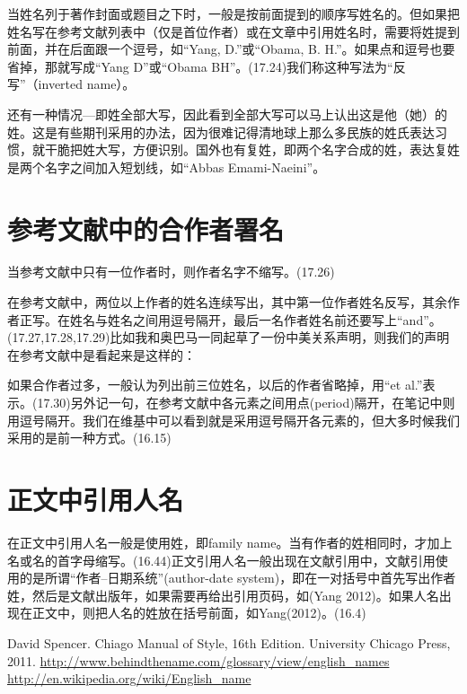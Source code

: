 \documentclass[UTF8,a4paper]{article}
\begin{document}
当姓名列于著作封面或题目之下时，一般是按前面提到的顺序写姓名的。但如果把姓名写在参考文献列表中（仅是首位作者）或在文章中引用姓名时，需要将姓提到前面，并在后面跟一个逗号，如“Yang, D.”或“Obama, B. H.”。如果点和逗号也要省掉，那就写成“Yang D”或“Obama BH”。(17.24)我们称这种写法为“反写”（inverted name）。

还有一种情况---即姓全部大写，因此看到全部大写可以马上认出这是他（她）的姓。这是有些期刊采用的办法，因为很难记得清地球上那么多民族的姓氏表达习惯，就干脆把姓大写，方便识别。国外也有复姓，即两个名字合成的姓，表达复姓是两个名字之间加入短划线，如“Abbas Emami-Naeini”。

\section{参考文献中的合作者署名}
当参考文献中只有一位作者时，则作者名字不缩写。(17.26)

在参考文献中，两位以上作者的姓名连续写出，其中第一位作者姓名反写，其余作者正写。在姓名与姓名之间用逗号隔开，最后一名作者姓名前还要写上“and”。(17.27,17.28,17.29)比如我和奥巴马一同起草了一份中美关系声明，则我们的声明在参考文献中是看起来是这样的：


如果合作者过多，一般认为列出前三位姓名，以后的作者省略掉，用“et al.”表示。(17.30)另外记一句，在参考文献中各元素之间用点(period)隔开，在笔记中则用逗号隔开。我们在维基中可以看到就是采用逗号隔开各元素的，但大多时候我们采用的是前一种方式。(16.15)

\section{正文中引用人名}
在正文中引用人名一般是使用姓，即family name。当有作者的姓相同时，才加上名或名的首字母缩写。(16.44)正文引用人名一般出现在文献引用中，文献引用使用的是所谓“作者--日期系统”(author-date system)，即在一对括号中首先写出作者姓，然后是文献出版年，如果需要再给出引用页码，如(Yang 2012)。如果人名出现在正文中，则把人名的姓放在括号前面，如Yang(2012)。(16.4)

\begin{thebibliography}{99}
 David Spencer. Chiago Manual of Style, 16th Edition. University Chicago Press, 2011.
\url{http://www.behindthename.com/glossary/view/english_names}
\url{http://en.wikipedia.org/wiki/English_name}
\end{thebibliography}
\end{document}
